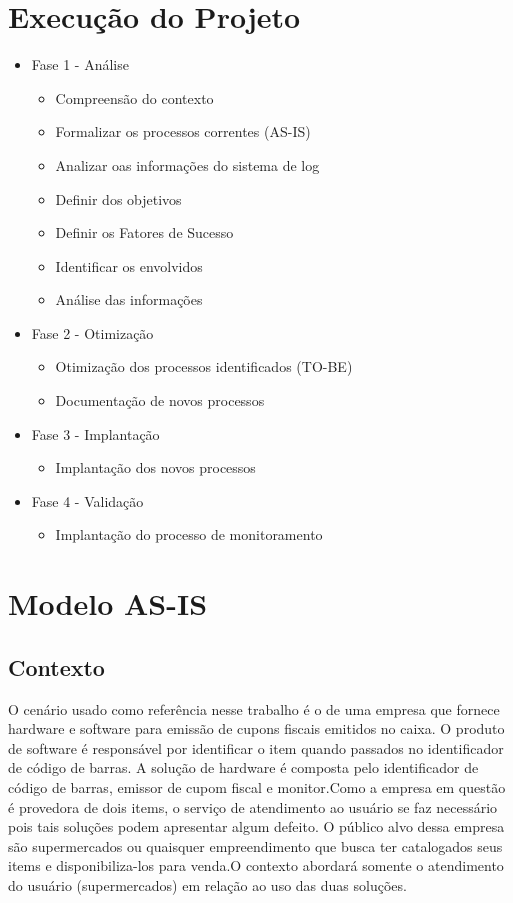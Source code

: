 \documentclass[11pt,a4paper]{article}
\begin{document}
\section{Execução do Projeto}
\begin{itemize}[noitemsep]
\item Fase 1 - Análise
	\begin{itemize}[noitemsep]
		\item Compreensão do contexto
		\item Formalizar os processos correntes (AS-IS)
		\item Analizar oas informações do sistema de log
		\item Definir dos objetivos
		\item Definir os Fatores de Sucesso
		\item Identificar os envolvidos
		\item Análise das informações
	\end{itemize}
\item Fase 2 - Otimização
	\begin{itemize}[noitemsep]
		\item Otimização dos processos identificados (TO-BE)
		\item Documentação de novos processos
	\end{itemize}
\item Fase 3 - Implantação
	\begin{itemize}[noitemsep]
		\item  Implantação dos novos processos
	\end{itemize}
\item Fase 4 - Validação
	\begin{itemize}[noitemsep]
		\item Implantação do processo de monitoramento
	\end{itemize}

\end{itemize}

\section{Modelo AS-IS}
\subsection{Contexto}
	O cenário usado como referência nesse trabalho é o de uma empresa que
	fornece hardware e software para emissão de cupons fiscais emitidos no
	caixa. O produto de software é responsável por identificar o item quando passados no
	identificador de código de barras. A solução de hardware é composta pelo identificador
	de código de barras, emissor de cupom fiscal e monitor.Como a empresa em questão é
	provedora de dois items, o serviço de atendimento ao
	usuário se faz necessário pois tais soluções podem apresentar algum defeito. O público alvo
	dessa empresa são supermercados ou quaisquer empreendimento que busca ter catalogados seus items
	e disponibiliza-los para venda.O contexto abordará somente o atendimento do usuário (supermercados) em
	relação ao uso das duas soluções.
\end{document}
